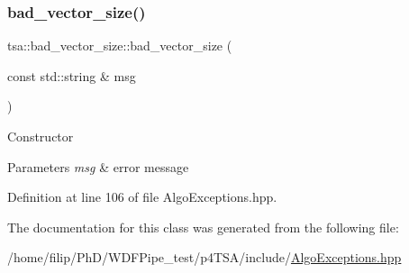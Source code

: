 \subsubsection{\texorpdfstring{bad\+\_\+vector\+\_\+size()}{bad\_vector\_size()}}
{\footnotesize\ttfamily tsa\+::bad\+\_\+vector\+\_\+size\+::bad\+\_\+vector\+\_\+size (\begin{DoxyParamCaption}\item[{const std\+::string \&}]{msg }\end{DoxyParamCaption})\hspace{0.3cm}{\ttfamily [inline]}}

Constructor


\begin{DoxyParams}{Parameters}
{\em msg} & error message \\
\hline
\end{DoxyParams}


Definition at line 106 of file Algo\+Exceptions.\+hpp.



The documentation for this class was generated from the following file\+:\begin{DoxyCompactItemize}
\item 
/home/filip/\+Ph\+D/\+W\+D\+F\+Pipe\+\_\+test/p4\+T\+S\+A/include/\hyperlink{_algo_exceptions_8hpp}{Algo\+Exceptions.\+hpp}\end{DoxyCompactItemize}
